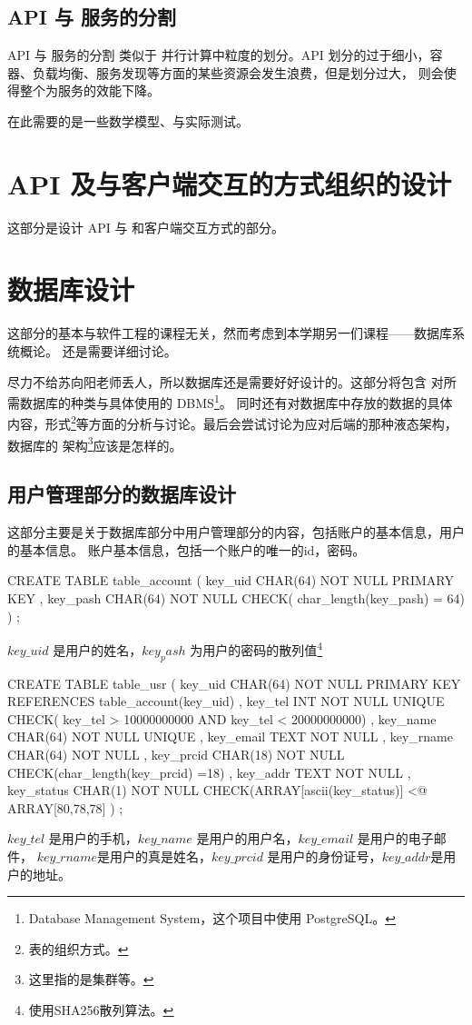 \subsection{API 与 服务的分割}
API 与 服务的分割 类似于 并行计算中粒度的划分。API 划分的过于细小，容器、负载均衡、服务发现等方面的某些资源会发生浪费，但是划分过大，
则会使得整个为服务的效能下降。

在此需要的是一些数学模型、与实际测试。

\section{API 及与客户端交互的方式组织的设计}
这部分是设计 API 与 和客户端交互方式的部分。
\section{数据库设计}
这部分的基本与软件工程的课程无关，然而考虑到本学期另一们课程——数据库系统概论。
还是需要详细讨论。

尽力不给苏向阳老师丢人，所以数据库还是需要好好设计的。这部分将包含 对所需数据库的种类与具体使用的 DBMS\footnote{Database Management System，这个项目中使用 PostgreSQL。}。
同时还有对数据库中存放的数据的具体内容，形式\footnote{表的组织方式。}等方面的分析与讨论。最后会尝试讨论为应对后端的那种液态架构，数据库的
架构\footnote{这里指的是集群等。}应该是怎样的。
\subsection{用户管理部分的数据库设计}
这部分主要是关于数据库部分中用户管理部分的内容，包括账户的基本信息，用户的基本信息。
账户基本信息，包括一个账户的唯一的id，密码。
\begin{sql}[caption=创建账户的表 table\_account]
    CREATE TABLE table_account
        ( key_uid CHAR(64) NOT NULL PRIMARY KEY
        , key_pash CHAR(64) NOT NULL CHECK( char_length(key_pash) = 64)
        )
    ;
\end{sql}
$key\_uid$ 是用户的姓名，$key_pash$ 为用户的密码的散列值\footnote{使用SHA256散列算法。}

\begin{sql}[caption=创建用户表 table\_usr]
    CREATE TABLE table_usr
        ( key_uid CHAR(64) NOT NULL PRIMARY KEY REFERENCES table_account(key_uid)
        , key_tel INT NOT NULL UNIQUE CHECK( key_tel > 10000000000 AND key_tel < 20000000000)
        , key_name CHAR(64) NOT NULL UNIQUE
        , key_email TEXT NOT NULL
        , key_rname CHAR(64) NOT NULL
        , key_prcid CHAR(18) NOT NULL CHECK(char_length(key_prcid) =18)
        , key_addr TEXT NOT NULL
        , key_status CHAR(1) NOT NULL CHECK(ARRAY[ascii(key_status)] <@ ARRAY[80,78,78]
        )
    ;
\end{sql}
$key\_tel$ 是用户的手机，$key\_name$ 是用户的用户名，$key\_email$ 是用户的电子邮件，
$key\_rname$是用户的真是姓名，$key\_prcid$ 是用户的身份证号，$key\_addr$是用户的地址。

